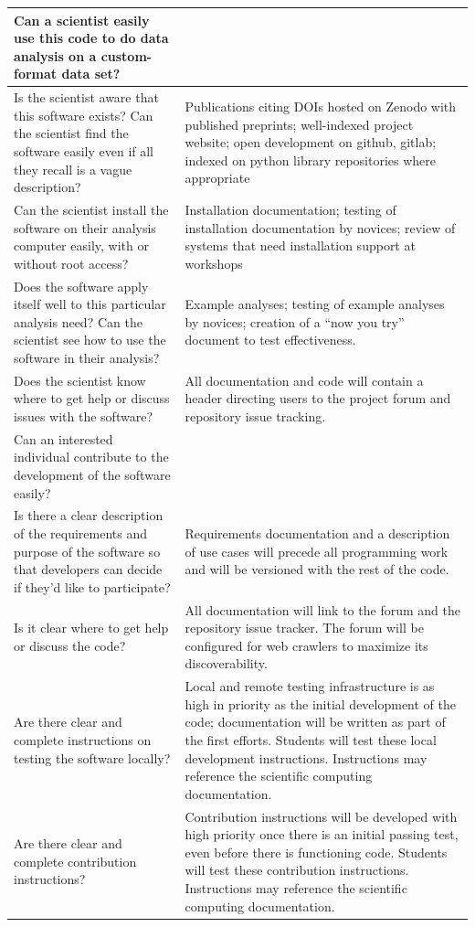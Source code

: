 \begin{tabularx}{\textwidth}{XX}
    Can a scientist easily use this code to do data analysis on a custom-format data set? & \\
    \toprule

    Is the scientist aware that this software exists?  Can the scientist find the software easily even if all they recall is a vague description?
    & Publications citing DOIs hosted on Zenodo with published preprints; well-indexed project website; open development on github, gitlab; indexed on python library repositories where appropriate \\
    Can the scientist install the software on their analysis computer easily, with or without root access?
    & Installation documentation; testing of installation documentation by novices; review of systems that need installation support at workshops \\
    Does the software apply itself well to this particular analysis need?  Can the scientist see how to use the software in their analysis?
    & Example analyses; testing of example analyses by novices; creation of a ``now you try'' document to test effectiveness. \\
    Does the scientist know where to get help or discuss issues with the software?
    & All documentation and code will contain a header directing users to the project forum and repository issue tracking. \\


Can an interested individual contribute to the development of the software easily? & \\
\toprule

    Is there a clear description of the requirements and purpose of the software so that developers can decide if they'd like to participate?
    & Requirements documentation and a description of use cases will precede all programming work and will be versioned with the rest of the code.\\
    Is it clear where to get help or discuss the code?
    & All documentation will link to the forum and the repository issue tracker.  The forum will be configured for web crawlers to maximize its discoverability.\\
    Are there clear and complete instructions on testing the software locally?
    & Local and remote testing infrastructure is as high in priority as the initial development of the code; documentation will be written as part of the first efforts.  Students will test these local development instructions.  Instructions may reference the scientific computing documentation.\\
    Are there clear and complete contribution instructions?
    & Contribution instructions will be developed with high priority once there is an initial passing test, even before there is functioning code.  Students will test these contribution instructions.  Instructions may reference the scientific computing documentation.\\
\end{tabularx}


